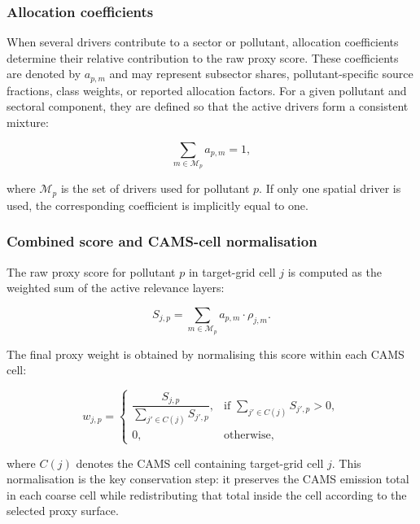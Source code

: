 \subsubsection{Allocation coefficients}
\label{sec:alpha}

When several drivers contribute to a sector or pollutant, allocation
coefficients determine their relative contribution to the raw proxy
score. These coefficients are denoted by $a_{p,m}$ and may represent
subsector shares, pollutant-specific source fractions, class weights, or
reported allocation factors. For a given pollutant and sectoral
component, they are defined so that the active drivers form a consistent
mixture:

\begin{equation}
  \sum_{m \in \mathcal{M}_{p}} a_{p,m} = 1,
\end{equation}

where $\mathcal{M}_{p}$ is the set of drivers used for pollutant $p$.
If only one spatial driver is used, the corresponding coefficient is
implicitly equal to one.

\subsubsection{Combined score and CAMS-cell normalisation}

The raw proxy score for pollutant $p$ in target-grid cell $j$ is
computed as the weighted sum of the active relevance layers:

\begin{equation}
  S_{j,p} =
  \sum_{m \in \mathcal{M}_{p}}
  a_{p,m} \cdot \rho_{j,m}.
\end{equation}

The final proxy weight is obtained by normalising this score within each
CAMS cell:

\begin{equation}
  w_{j,p} =
  \begin{cases}
    \dfrac{S_{j,p}}
          {\displaystyle\sum_{j' \in C(j)} S_{j',p}},
    & \text{if } \displaystyle\sum_{j' \in C(j)} S_{j',p} > 0, \\
    0,
    & \text{otherwise,}
  \end{cases}
\end{equation}

where $C(j)$ denotes the CAMS cell containing target-grid cell $j$.
This normalisation is the key conservation step: it preserves the CAMS
emission total in each coarse cell while redistributing that total
inside the cell according to the selected proxy surface.

